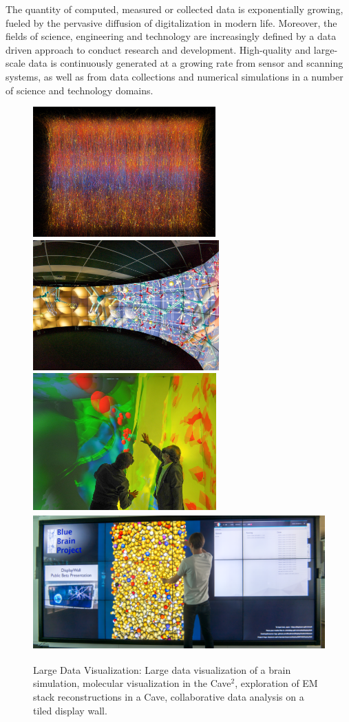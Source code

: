 The quantity of computed, measured or collected data is exponentially growing,
fueled by the pervasive diffusion of digitalization in modern life. Moreover,
the fields of science, engineering and technology are increasingly defined by a
data driven approach to conduct research and development. High-quality and
large-scale data is continuously generated at a growing rate from sensor and
scanning systems, as well as from data collections and numerical simulations in
a number of science and technology domains.

\begin{figure}[ht]\label{FIG_teaser}
\includegraphics[height=5cm]{images/slices}\hfil%
\includegraphics[height=5cm]{images/cave2}\\%
\includegraphics[height=5.27cm]{images/cave}\hfil%
\includegraphics[height=5.27cm]{images/tide}%
\caption{Large Data Visualization: Large data visualization of a
      brain simulation, molecular visualization in the Cave$^2$, exploration of EM
      stack reconstructions in a Cave, collaborative data analysis on a tiled
      display wall.}
\end{figure}


